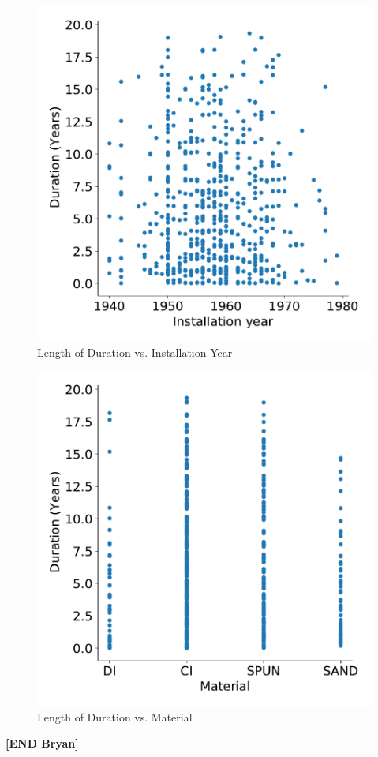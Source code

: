 \documentclass[twocolumn]{article}
\begin{document}
\begin{figure}[h!]
   \centering
    \includegraphics[scale = 0.5]{Bryan/duration_installyear.pdf}
    \caption{Length of Duration vs. Installation Year}
    \label{fig:duration by install year}
\end{figure}

\begin{figure}[h!]
   \centering
    \includegraphics[scale = 0.5]{Bryan/duration_material.pdf}
    \caption{Length of Duration vs. Material}
    \label{fig:duration by material}
\end{figure}
\textbf{[END Bryan]}
\end{document}

